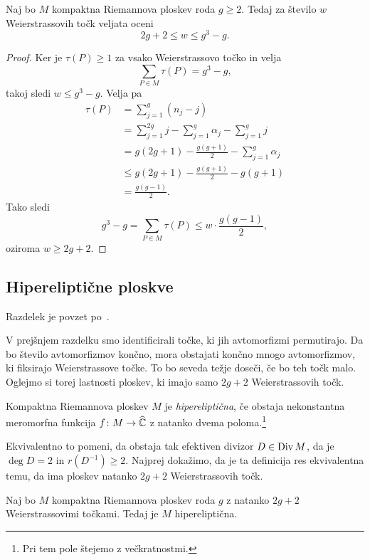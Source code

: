 \begin{trditev}
Naj bo $M$ kompaktna Riemannova ploskev roda $g \geq 2$. Tedaj za
število $w$ Weierstrassovih točk veljata oceni
\[
2g + 2 \leq w \leq g^3 - g.
\]
\end{trditev}

\begin{proof}
Ker je $\tau(P) \geq 1$ za vsako Weierstrassovo točko in velja
\[
\sum_{P \in M} \tau(P) = g^3 - g,
\]
takoj sledi $w \leq g^3 - g$. Velja pa
\begin{align*}
\tau(P) &= \sum_{j=1}^g (n_j - j)
\\
&=
\sum_{j=1}^{2g} j - \sum_{j=1}^g \alpha_j - \sum_{j=1}^g j
\\
&=
g(2g+1) - \frac{g(g+1)}{2} - \sum_{j=1}^g \alpha_j
\\
&\leq
g(2g+1) - \frac{g(g+1)}{2} - g(g+1)
\\
&=
\frac{g(g-1)}{2}.
\end{align*}
Tako sledi
\[
g^3 - g = \sum_{P \in M} \tau(P) \leq w \cdot \frac{g(g-1)}{2},
\]
oziroma $w \geq 2g + 2$.
\end{proof}

\subsection{Hipereliptične ploskve}

Razdelek je povzet po~\cite[poglavje III.7]{Farkas_Kra_1980}.

V prejšnjem razdelku smo identificirali točke, ki jih avtomorfizmi
permutirajo. Da bo število avtomorfizmov končno, mora obstajati
končno mnogo avtomorfizmov, ki fiksirajo Weierstrassove točke. To
bo seveda težje doseči, če bo teh točk malo. Oglejmo si torej
lastnosti ploskev, ki imajo samo $2g + 2$ Weierstrassovih točk.

\begin{definicija}
Kompaktna Riemannova ploskev $M$ je \emph{hipereliptična}, če
obstaja nekonstantna meromorfna funkcija $f \colon M \to \widehat{\mathbb{C}}$ z
natanko dvema poloma.\footnote{Pri tem pole štejemo z
večkratnostmi.}
\end{definicija}

Ekvivalentno to pomeni, da obstaja tak efektiven divizor
$D \in \operatorname{Div} M$, da je $\deg D = 2$ in $r(D^{-1}) \geq 2$. Najprej
dokažimo, da je ta definicija res ekvivalentna temu, da ima ploskev
natanko $2g + 2$ Weierstrassovih točk.

\begin{trditev}
Naj bo $M$ kompaktna Riemannova ploskev roda $g$ z natanko $2g + 2$
Weierstrassovimi točkami. Tedaj je $M$ hipereliptična.
\end{trditev}

